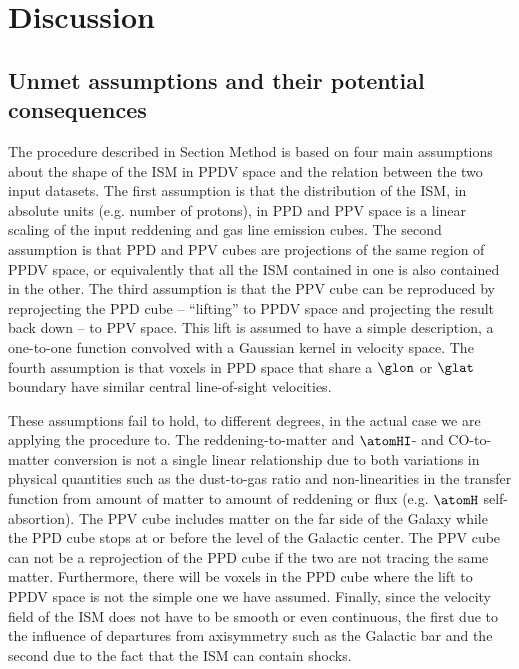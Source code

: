 \section{Discussion}
\label{sec:discussion}

\subsection{Unmet assumptions and their potential consequences}
\label{sec:discussion-systematics}


The procedure described in Section Method is based on four main assumptions about the shape of the ISM in PPDV space and the relation between the two input datasets.
The first assumption is that the distribution of the ISM, in absolute units (e.g. number of protons), in PPD and PPV space is a linear scaling of the input reddening and gas line emission cubes.
The second assumption is that PPD and PPV cubes are projections of the same region of PPDV space, or equivalently that all the ISM contained in one is also contained in the other.
The third assumption is that the PPV cube can be reproduced by reprojecting the PPD cube -- ``lifting'' to PPDV space and projecting the result back down -- to PPV space.
This lift is assumed to have a simple description, a one-to-one function convolved with a Gaussian kernel in velocity space.
The fourth assumption is that voxels in PPD space that share a $\glon$ or $\glat$ boundary have similar central line-of-sight velocities.

These assumptions fail to hold, to different degrees, in the actual case we are applying the procedure to. 
The reddening-to-matter and $\atomHI$- and CO-to-matter conversion is not a single linear relationship due to both variations in physical quantities such as the dust-to-gas ratio and non-linearities in the transfer function from amount of matter to amount of reddening or flux (e.g. $\atomH$ self-absortion). 
The PPV cube includes matter on the far side of the Galaxy while the PPD cube stops at or before the level of the Galactic center.
The PPV cube can not be a reprojection of the PPD cube if the two are not tracing the same matter. 
Furthermore, there will be voxels in the PPD cube where the lift to PPDV space is not the simple one we have assumed.
Finally, since the velocity field of the ISM does not have to be smooth or even continuous, the first due to the influence of departures from axisymmetry such as the Galactic bar and the second due to the fact that the ISM can contain shocks.

